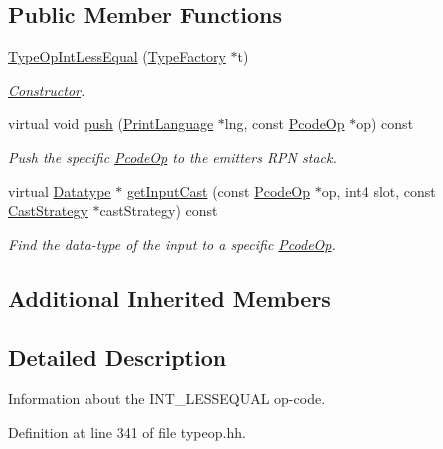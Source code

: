 \subsection*{Public Member Functions}
\begin{DoxyCompactItemize}
\item 
\mbox{\hyperlink{class_type_op_int_less_equal_ac661a14c4a29c1a945604c15d8abb3fc}{Type\+Op\+Int\+Less\+Equal}} (\mbox{\hyperlink{class_type_factory}{Type\+Factory}} $\ast$t)
\begin{DoxyCompactList}\small\item\em \mbox{\hyperlink{class_constructor}{Constructor}}. \end{DoxyCompactList}\item 
virtual void \mbox{\hyperlink{class_type_op_int_less_equal_a9ddf23cf8017278798cb8570459cf544}{push}} (\mbox{\hyperlink{class_print_language}{Print\+Language}} $\ast$lng, const \mbox{\hyperlink{class_pcode_op}{Pcode\+Op}} $\ast$op) const
\begin{DoxyCompactList}\small\item\em Push the specific \mbox{\hyperlink{class_pcode_op}{Pcode\+Op}} to the emitter\textquotesingle{}s R\+PN stack. \end{DoxyCompactList}\item 
virtual \mbox{\hyperlink{class_datatype}{Datatype}} $\ast$ \mbox{\hyperlink{class_type_op_int_less_equal_abd2012e03caf7a3874a27f25f510e95c}{get\+Input\+Cast}} (const \mbox{\hyperlink{class_pcode_op}{Pcode\+Op}} $\ast$op, int4 slot, const \mbox{\hyperlink{class_cast_strategy}{Cast\+Strategy}} $\ast$cast\+Strategy) const
\begin{DoxyCompactList}\small\item\em Find the data-\/type of the input to a specific \mbox{\hyperlink{class_pcode_op}{Pcode\+Op}}. \end{DoxyCompactList}\end{DoxyCompactItemize}
\subsection*{Additional Inherited Members}


\subsection{Detailed Description}
Information about the I\+N\+T\+\_\+\+L\+E\+S\+S\+E\+Q\+U\+AL op-\/code. 

Definition at line 341 of file typeop.\+hh.



